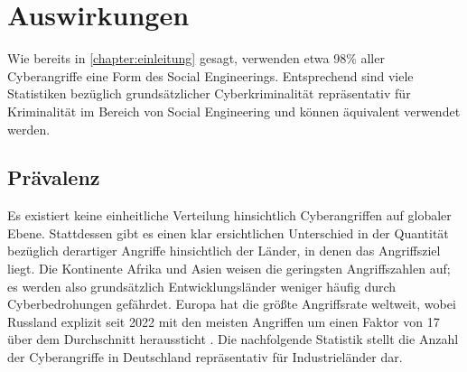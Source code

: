 \chapter{Auswirkungen}
\label{chapter:auswirkungen}

Wie bereits in \autoref{chapter:einleitung} gesagt, verwenden etwa 98\% aller Cyberangriffe eine Form des Social Engineerings.
Entsprechend sind viele Statistiken bezüglich grundsätzlicher Cyberkriminalität repräsentativ für Kriminalität im Bereich von Social Engineering und können äquivalent verwendet werden.

\section{Prävalenz}

Es existiert keine einheitliche Verteilung hinsichtlich Cyberangriffen auf globaler Ebene.
Stattdessen gibt es einen klar ersichtlichen Unterschied in der Quantität bezüglich derartiger Angriffe hinsichtlich der Länder, in denen das Angriffsziel liegt.
Die Kontinente Afrika und Asien weisen die geringsten Angriffszahlen auf; es werden also grundsätzlich Entwicklungsländer weniger häufig durch Cyberbedrohungen gefährdet.
Europa hat die größte Angriffsrate weltweit, wobei Russland explizit seit 2022 mit den meisten Angriffen um einen Faktor von 17 über dem Durchschnitt heraussticht .
Die nachfolgende Statistik stellt die Anzahl der Cyberangriffe in Deutschland repräsentativ für Industrieländer dar.

